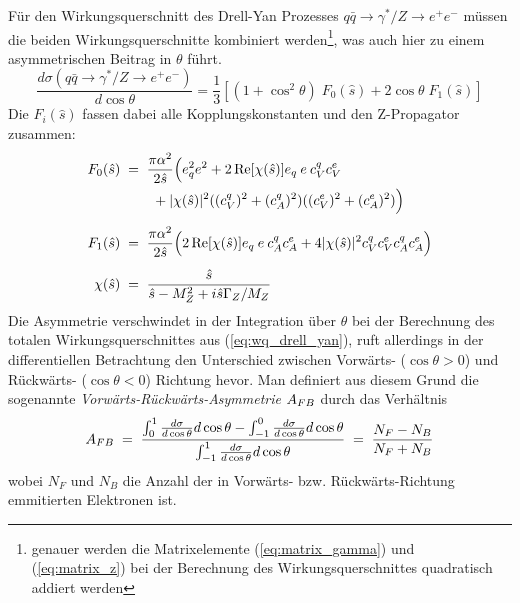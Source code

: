 Für den Wirkungsquerschnitt des Drell-Yan Prozesses $q\bar q \rightarrow
\gamma^*/Z \rightarrow e^+e^-$ müssen die beiden Wirkungsquerschnitte
kombiniert werden\footnote{genauer werden die Matrixelemente
(\ref{eq:matrix_gamma}) und (\ref{eq:matrix_z}) bei der Berechnung des
Wirkungsquerschnittes quadratisch addiert werden}, was auch hier zu einem 
asymmetrischen Beitrag in $\theta$ führt.
\begin{equation}
    \frac{d\sigma(q\bar q\rightarrow\gamma^*/Z\rightarrow e^+e^-)}{d\cos\theta}
        = \frac{1}{3}
          \left[
              (1+\cos^2\theta) \; F_0(\hat s)
              + 2\cos\theta \; F_1(\hat s)
          \right]
    \label{eq:wq_drell_yan}
\end{equation}
Die $F_i(\hat s)$ fassen dabei alle Kopplungskonstanten und den Z-Propagator
zusammen:
\begin{align}
    F_0(\hat s) \; &= \;
        \frac{\pi \alpha^2}{2 \hat s}
        \Bigl(
            e_q^2 e^2 + 2 \operatorname{Re}[\chi(\hat s)] e_q \:e\: c_V^q c_V^e
            \nonumber \\ & \qquad
            + |\chi(\hat s)|^2 ((c_V^q)^2+(c_A^q)^2)((c_V^e)^2+(c_A^e)^2)
        \Bigr)
        \\[5pt]
    F_1(\hat s) \; &= \;
        \frac{\pi \alpha^2}{2 \hat s}
        \Bigl(
            2\operatorname{Re}[\chi(\hat s)] e_q \:e\: c_A^q c_A^e
            + 4|\chi(\hat s)|^2 c_V^q c_V^e c_A^q c_A^e
        \Bigr)
        \\[5pt]
    \chi(\hat s) \; &= \;
        \frac{\hat s}{\hat s - M_Z^2 + i\hat s \Gamma_Z/M_Z}
\end{align}
Die Asymmetrie verschwindet in der Integration über $\theta$ bei der
Berechnung des totalen Wirkungsquerschnittes aus (\ref{eq:wq_drell_yan}), ruft
allerdings in der differentiellen Betrachtung den Unterschied zwischen
Vorwärts- ($\cos\theta > 0$) und Rückwärts- ($\cos\theta < 0$) Richtung hevor. 
Man definiert aus diesem Grund die sogenannte
\textit{Vorwärts-Rückwärts-Asymmetrie} $A_{FB}$ durch das Verhältnis
\begin{equation}
    A_{FB} \;=\; \frac{ \int_0^1    \frac{d\sigma}{d\cos\theta} d\cos\theta
                    - \int_{-1}^0 \frac{d\sigma}{d\cos\theta} d\cos\theta
                    }{\int_{-1}^1 \frac{d\sigma}{d\cos\theta} d\cos\theta}
         \;=\; \frac{N_F - N_B}{N_F + N_B}
\end{equation}
wobei $N_F$ und $N_B$ die Anzahl der in Vorwärts- bzw. Rückwärts-Richtung
emmitierten Elektronen ist.



